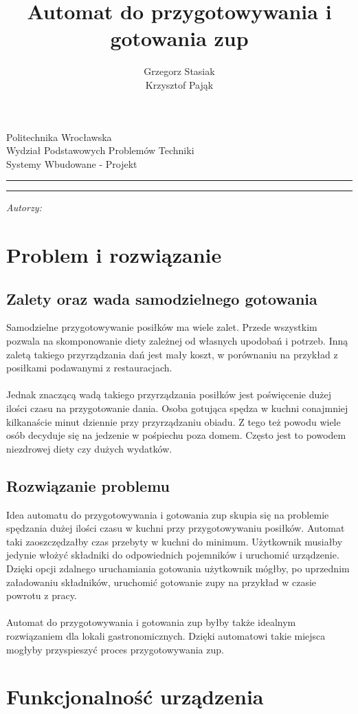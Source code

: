 \documentclass[12pt,a4paper,notitlepage]{article}
\author{Grzegorz Stasiak\\Krzysztof Pająk}
\title{Automat do przygotowywania i gotowania zup}
\makeatletter
\newcommand{\linia}{\rule{\linewidth}{0.4mm}}
\renewcommand{\maketitle}{\begin{titlepage}
    \vspace*{1cm}
    \begin{center}\small
    Politechnika Wrocławska\\
    Wydział Podstawowych Problemów Techniki\\
    Systemy Wbudowane - Projekt
    \end{center}
    \vspace{3cm}
    \noindent\linia
    \begin{center}
      \LARGE \textsc{\@title}
         \end{center}
     \linia
    \vspace{0.5cm}
    \begin{flushright}
    \begin{minipage}{5cm}
    \textit{\small Autorzy:}\\
    \normalsize \textsc{\@author} \par
    \end{minipage}
    \vspace{5cm}
     \end{flushright}
    \vspace*{\stretch{6}}
    \begin{center}
    \@date
    \end{center}
  \end{titlepage}
}
\makeatother
\begin{document}
\maketitle
\tableofcontents
\newpage

\section{Problem i rozwiązanie}
\subsection{Zalety oraz wada samodzielnego gotowania}
Samodzielne przygotowywanie posiłków ma wiele zalet. Przede wszystkim pozwala na skomponowanie diety zależnej od własnych upodobań i potrzeb. Inną zaletą takiego przyrządzania dań jest mały koszt, w porównaniu na przykład z posiłkami podawanymi z restauracjach.\\ \\
Jednak znaczącą wadą takiego przyrządzania posiłków jest poświęcenie dużej ilości czasu na przygotowanie dania. Osoba gotująca spędza w kuchni conajmniej kilkanaście minut dziennie przy przyrządzaniu obiadu. Z tego też powodu wiele osób decyduje się na jedzenie w pośpiechu poza domem. Często jest to powodem niezdrowej diety czy dużych wydatków.

\subsection{Rozwiązanie problemu}
Idea automatu do przygotowywania i gotowania zup skupia się na problemie spędzania dużej ilości czasu w kuchni przy przygotowywaniu posiłków. Automat taki zaoszczędzałby czas przebyty w kuchni do minimum. Użytkownik musiałby jedynie włożyć składniki do odpowiednich pojemników i uruchomić urządzenie. Dzięki opcji zdalnego uruchamiania gotowania użytkownik mógłby, po uprzednim załadowaniu składników, uruchomić gotowanie zupy na przykład w czasie powrotu z pracy.\\ \\
Automat do przygotowywania i gotowania zup byłby także idealnym rozwiązaniem dla lokali gastronomicznych. Dzięki automatowi takie miejsca mogłyby przyspieszyć proces przygotowywania zup. 

\section{Funkcjonalność urządzenia}
\end{document}

